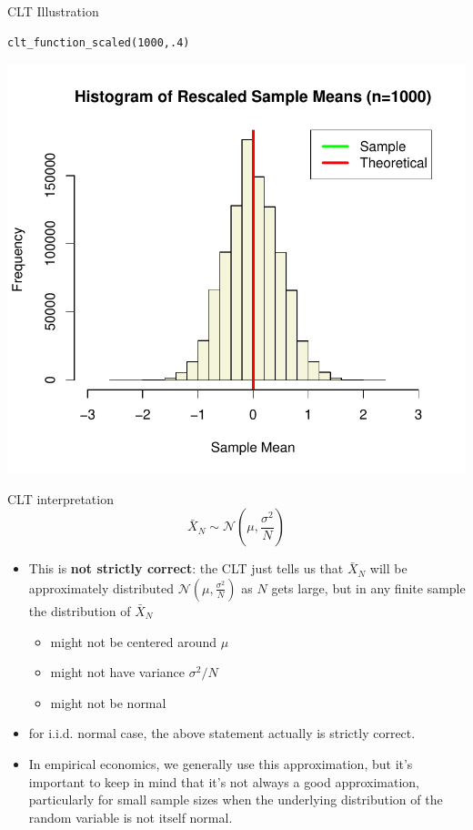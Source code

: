 \begin{frame}[fragile]{CLT Illustration}
\begin{lstlisting}
clt_function_scaled(1000,.4)
\end{lstlisting}
\begin{center}
\includegraphics[height=.8\textheight]{clts1000}
\end{center}
\end{frame}




\begin{frame}{CLT interpretation}
 \[
\bar{X}_{N}\sim\mathcal{N}\left(\mu,\frac{\sigma^{2}}{N}\right)
\]
\begin{itemize}

	\item This is {\bf not strictly correct}: the CLT just tells us that $\bar{X}_{N}$ will be approximately
			 distributed  $\mathcal{N}\left(\mu,\frac{\sigma^{2}}{N}\right)$ as $N$ gets large,
			but in any finite sample the distribution of $\bar{X}_{N}$
	\begin{itemize}
		\item might not be centered around $\mu$
		\item might not have variance $\sigma^2/N$
		\item might not be normal
	\end{itemize}

	\item for i.i.d. normal case, the above statement actually is strictly correct. 

	\item In empirical economics, we generally use this approximation, but it's important to keep
			in mind that it's not always a good approximation, particularly for small sample sizes when
			the underlying distribution of the random variable is not itself normal.
\end{itemize}
\end{frame}



